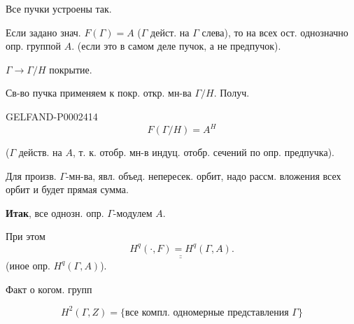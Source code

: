Все пучки устроены так.



Если задано знач. $F(\Gamma)=A$ ($\Gamma$ дейст. на $\Gamma$ слева), то на всех ост. однозначно опр. группой $A$. (если это в самом деле пучок, а не предпучок).



$\Gamma\longrightarrow\Gamma/H$ \qquad покрытие.



Св-во пучка применяем к покр. откр. мн-ва $\Gamma/H$. Получ.



\begin{GelfandAdjacentEvidence}{GELFAND-P000241}{4}
\begin{equation*}F(\Gamma/H)=A^H\end{equation*}



\end{GelfandAdjacentEvidence}

($\Gamma$ действ. на $A$, т. к. отобр. мн-в индуц. отобр. сечений по опр. предпучка).





Для произв. $\Gamma$-мн-ва, явл. объед. непересек. орбит, надо рассм. вложения всех орбит и будет прямая сумма.



\textbf{Итак}, все однозн. опр. $\Gamma$-модулем $A$.



При этом
\begin{equation*}
\underline{\underline{H^q(\cdot,F)=H^q(\Gamma,A)}}.
\end{equation*}
(иное опр. $H^q(\Gamma,A)$).



Факт о когом. групп



\begin{equation*}
H^2(\Gamma,Z)=\{\text{все компл. одномерные представления }\Gamma\}
\end{equation*}



